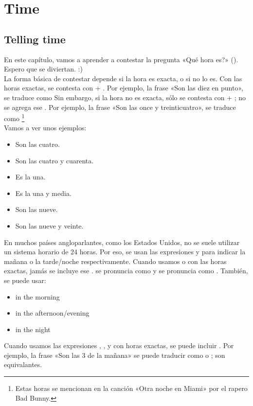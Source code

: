 \chapter{Time}

\section{Telling time}

En este cap\'itulo, vamos a aprender a contestar la pregunta «\textquestiondown Qu\'e hora es?» ().
Espero que se diviertan. :) \\

La forma b\'asica de contestar depende si la hora es exacta, o si no lo es.
Con las horas exactas, se contesta con  + .
Por ejemplo, la frase «Son las diez en punto», se traduce como 
Sin embargo, si la hora no es exacta, s\'olo se contesta con
 + ; no se agrega ese .
Por ejemplo, la frase «Son las once y treinticuatro», se traduce como 
\footnote{Estas horas se mencionan en la canci\'on «Otra noche en Miami» por el rapero Bad Bunny.} \\

Vamos a ver unos ejemplos:
\begin{itemize}
	\item Son las cuatro. \arr {}
	\item Son las cuatro y cuarenta. \arr {}
	\item Es la una. \arr {}
	\item Es la una y media. \arr {}
	\item Son las nueve. \arr {}
	\item Son las nueve y veinte. \arr {}
\end{itemize}

En muchos pa\'ises angloparlantes, como los Estados Unidos, no se suele utilizar un sistema horario de 24 horas.
Por eso, se usan las expresiones  y  para indicar la mañana o la tarde/noche respectivamente.
Cuando usamos  o  con las horas exactas, jam\'as se incluye ese .  se pronuncia como  y  se pronuncia como .
Tambi\'en, se puede usar:
\begin{itemize}
	\item in the morning \arr {}
	\item in the afternoon/evening \arr {}
	\item in the night \arr {}
\end{itemize}
Cuando usamos las expresiones , , y  con
horas exactas, se puede incluir . Por ejemplo, la frase «Son las 3 de la ma\~nana» se puede traducir
como  o ; son equivalantes. \\

